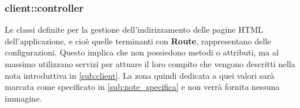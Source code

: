 %


\subsubsection{client::controller} %
\label{ssub:bdsm_app_client_controller}
Le classi definite per la gestione dell'indirizzamento delle pagine HTML dell'applicazione, e cioè quelle terminanti con \textbf{Route}, rappresentano delle configurazioni. Questo implica che non possiedono metodi o attributi, ma al massimo utilizzano servizi per attuare il loro compito che vengono descritti nella nota introduttiva in \ref{sub:client}. La zona quindi dedicata a quei valori sarà marcata come specificato in \ref{sub:note_specifica} e non verrà fornita nessuna immagine.


